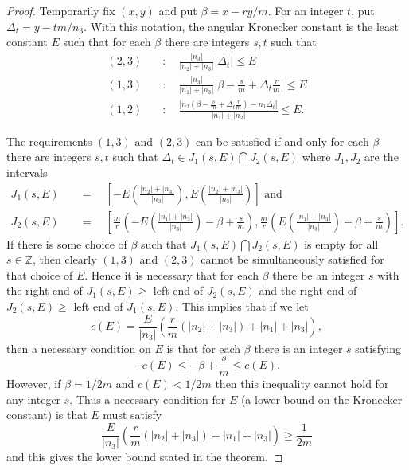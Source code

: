 \documentclass{amsart}
\begin{document}
\begin{proof}
Temporarily fix $(x,y)$ and put $\beta =x-ry/m$. For an integer $t$, put $\Delta _{t}=y-tm/n_{3}$. With this notation, the angular Kronecker constant
is the least constant $E$ such that for each $\beta $ there are integers $s,t $ such that
$$
\begin{aligned}
(2,3) &\quad:\quad\frac{\left\vert n_{3}\right\vert }{\left\vert n_{2}\right\vert
+\left\vert n_{3}\right\vert }\left\vert \Delta _{t}\right\vert \leq E \\
(1,3) &\quad:\quad\frac{\left\vert n_{3}\right\vert }{\left\vert n_{1}\right\vert
+\left\vert n_{3}\right\vert }\left\vert \beta -\frac{s}{m}+\Delta _{t}\frac{r}{m}\right\vert \leq E \\
(1,2) &\quad:\quad\frac{\left\vert n_{2}(\beta -\frac{s}{m}+\Delta _{t}\frac{r}{m})-n_{1}\Delta _{t}\right\vert }{\left\vert n_{1}\right\vert +\left\vert
n_{2}\right\vert }\leq E.
\end{aligned}
$$

The requirements $(1,3)$ and $(2,3)$ can be satisfied if and only for each $\beta $ there are integers $s,t$ such that $\Delta _{t}\in
J_{1}(s,E){\bigcap} J_{2}(s,E)$ where $J_{1},J_{2}$ are the intervals
$$
\begin{aligned}
J_{1}(s,E) &\quad=\quad\left[ -E\left( \frac{\left\vert n_{2}\right\vert +\left\vert
n_{3}\right\vert }{\left\vert n_{3}\right\vert }\right) ,E\left( \frac{\left\vert n_{2}\right\vert +\left\vert n_{3}\right\vert }{\left\vert
n_{3}\right\vert }\right) \right] \text{ and} \\
J_{2}(s,E) &\quad=\quad\left[ \frac{m}{r}\left( -E\left( \frac{\left\vert
n_{1}\right\vert +\left\vert n_{3}\right\vert }{\left\vert n_{3}\right\vert }\right) -\beta +\frac{s}{m}\right) ,\frac{m}{r}\left( E\left( \frac{\left\vert n_{1}\right\vert +\left\vert n_{3}\right\vert }{\left\vert
n_{3}\right\vert }\right) -\beta +\frac{s}{m}\right) \right] .
\end{aligned}
$$
If there is some choice of $\beta $ such that $J_{1}(s,E){\bigcap} J_{2}(s,E)$
is empty for all $s\in \mathbb{Z}$, then clearly $(1,3)$ and $(2,3)$ cannot
be simultaneously satisfied for that choice of $E$. Hence it is necessary
that for each $\beta $ there be an integer $s$ with the right end of $J_{1}(s,E)\geq $ left end of $J_{2}(s,E)$ and the right end of $J_{2}(s,E)\geq $ left end of $J_{1}(s,E)$. This implies that if we let
$$
c(E)=\frac{E}{\left\vert n_{3}\right\vert }\left( \frac{r}{m}(\left\vert
n_{2}\right\vert +\left\vert n_{3}\right\vert )+\left\vert n_{1}\right\vert
+\left\vert n_{3}\right\vert \right) ,
$$
then a necessary condition on $E$ is that for each $\beta $ there is an
integer $s$ satisfying
$$
-c(E)\leq -\beta +\frac{s}{m}\leq c(E).
$$
However, if $\beta =1/2m$ and $c(E)<1/2m$ then this inequality cannot hold
for any integer $s$. Thus a necessary condition for $E$ (a lower bound on
the Kronecker constant) is that $E$ must satisfy$$
\frac{E}{\left\vert n_{3}\right\vert }\left( \frac{r}{m}(\left\vert
n_{2}\right\vert +\left\vert n_{3}\right\vert )+\left\vert n_{1}\right\vert
+\left\vert n_{3}\right\vert \right) \geq \frac{1}{2m}
$$
and this gives the lower bound stated in the theorem.


\end{proof}
\end{document}
